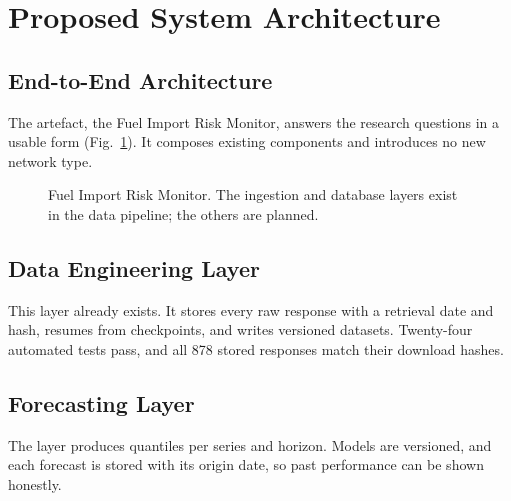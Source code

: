 \documentclass[conference]{IEEEtran}
\begin{document}
\section{Proposed System Architecture}\label{sec:arch}

\subsection{End-to-End Architecture}
The artefact, the Fuel Import Risk Monitor, answers the research questions in a usable form (Fig.~\ref{fig:arch}). It composes existing components and introduces no new network type.

\begin{figure}[t]
\centering
{}
\caption{Fuel Import Risk Monitor. The ingestion and database layers exist in the data pipeline; the others are planned.}
\label{fig:arch}
\end{figure}

\subsection{Data Engineering Layer}
This layer already exists. It stores every raw response with a retrieval date and hash, resumes from checkpoints, and writes versioned datasets. Twenty-four automated tests pass, and all 878 stored responses match their download hashes.

\subsection{Forecasting Layer}
The layer produces quantiles per series and horizon. Models are versioned, and each forecast is stored with its origin date, so past performance can be shown honestly.
\end{document}
